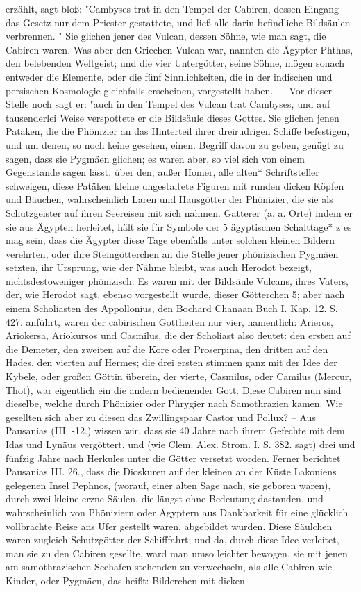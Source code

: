 \documentclass[a4paper, 11pt, oneside, polutonikogreek, german]{article}
\begin{document}
erzählt, sagt bloß: "Cambyses trat in den Tempel der Cabiren, dessen Eingang das Gesetz nur dem Priester gestattete, und ließ alle darin befindliche Bildsäulen verbrennen. " Sie glichen jener des Vulcan, dessen Söhne, wie man sagt, die Cabiren waren. Was aber den Griechen Vulcan war, nannten die Ägypter Phthas, den belebenden Weltgeist; und die vier Untergötter, seine Söhne, mögen sonach entweder die Elemente, oder die fünf Sinnlichkeiten, die in der indischen und persischen Kosmologie gleichfalls erscheinen, vorgestellt haben. --- Vor dieser Stelle noch sagt er: "auch in den Tempel des Vulcan trat Cambyses, und auf tausenderlei Weise verspottete er die Bildsäule dieses Gottes. Sie glichen jenen Patäken, die die Phönizier an das Hinterteil ihrer dreirudrigen Schiffe befestigen, und um denen, so noch keine gesehen, einen. Begriff davon zu geben, genügt zu sagen, dass sie Pygmäen glichen; es waren aber, so viel sich von einem Gegenstande sagen lässt, über den, außer Homer, alle alten* Schriftsteller schweigen, diese Patäken kleine ungestaltete Figuren mit runden dicken Köpfen und Bäuchen, wahrscheinlich Laren und Hausgötter der Phönizier, die sie als Schutzgeister auf ihren Seereisen mit sich nahmen. Gatterer (a. a. Orte) indem er sie aus Ägypten herleitet, hält sie für Symbole der 5 ägyptischen Schalttage* z es mag sein, dass die Ägypter diese Tage ebenfalls unter solchen kleinen Bildern verehrten, oder ihre Steingötterchen an die Stelle jener phönizischen Pygmäen setzten, ihr Ursprung, wie der Nähme bleibt, was auch Herodot bezeigt, nichtsdestoweniger phönizisch. Es waren mit der Bildsäule Vulcans, ihres Vaters, der, wie Herodot sagt, ebenso vorgestellt wurde, dieser Götterchen 5; aber nach einem Scholiasten des Appollonius, den Bochard Chanaan Buch I. Kap. 12. S. 427. anführt, waren der cabirischen Gottheiten nur vier, namentlich: Arieros, Ariokersa, Ariokursos und Casmilus, die der Scholiast also deutet: den ersten auf die Demeter, den zweiten auf die Kore oder Proserpina, den dritten auf den Hades, den vierten auf Hermes; die drei ersten stimmen ganz mit der Idee der Kybele, oder großen Göttin überein, der vierte, Casmilus, oder Camilus (Mercur, Thot), war eigentlich ein die andern bedienender Gott. Diese Cabiren nun sind dieselbe, welche durch Phönizier oder Phrygier nach Samothrazien kamen. Wie gesellten sich aber zu diesen das Zwillingspaar Castor und Pollux? -- Aus Pausanias (III. -12.) wissen wir, dass sie 40 Jahre nach ihrem Gefechte mit dem Idas und Lynäus vergöttert, und (wie Clem. Alex. Strom. I. S. 382. sagt) drei und fünfzig Jahre nach Herkules unter die Götter versetzt worden. Ferner berichtet Pausanias III. 26., dass die Dioskuren auf der kleinen an der Küste Lakoniens gelegenen Insel Pephnos, (worauf, einer alten Sage nach, sie geboren waren), durch zwei kleine erzne Säulen, die längst ohne Bedeutung dastanden, und wahrscheinlich von Phöniziern oder Ägyptern aus Dankbarkeit für eine glücklich vollbrachte Reise ans Ufer gestellt waren, abgebildet wurden. Diese Säulchen waren zugleich Schutzgötter der Schifffahrt; und da, durch diese Idee verleitet, man sie zu den Cabiren gesellte, ward man umso leichter bewogen, sie mit jenen am samothrazischen Seehafen stehenden zu verwechseln, als alle Cabiren wie Kinder, oder Pygmäen, das heißt: Bilderchen mit dicken 
\end{document}
